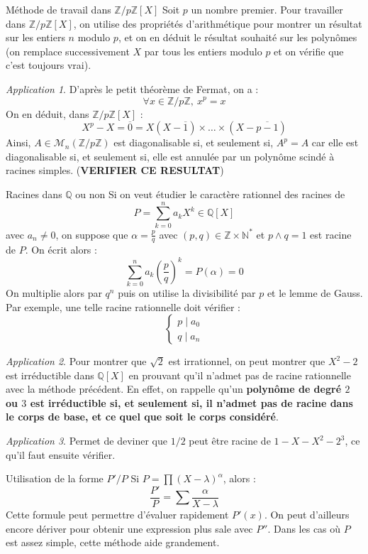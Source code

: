 \documentclass[french]{book}
\newcommand{\N}{\mathbb{N}}
\newcommand{\Z}{\mathbb{Z}}
\newcommand{\Q}{\mathbb{Q}}
\newcommand{\st}{^*}
\theoremstyle{plain}
\theoremstyle{definition}
\theoremstyle{remark}
\newtheorem*{app}{Application}
\begin{document}
\begin{AS}{Méthode de travail dans $\Z/p\Z[X]$} Soit $p$ un nombre premier. Pour travailler dans $\Z/p\Z[X]$, on utilise des propriétés d’arithmétique pour montrer un résultat sur les entiers $n$ modulo $p$, et on en déduit le résultat souhaité sur les polynômes (on remplace successivement $X$ par tous les entiers modulo $p$ et on vérifie que c’est toujours vrai).
\end{AS}
\begin{app}
	D'après le petit théorème de Fermat, on a : $$\forall x\in\Z/p\Z,\ x^p=x$$ On en déduit, dans $\Z/p\Z[X]$ : $$X^p-X=\overline{0}=X(X-\overline{1})\times\ldots\times(X-\overline{p-1})$$ Ainsi, $A\in\mathcal{M}_n(\Z/p\Z)$ est diagonalisable si, et seulement si, $A^p=A$ car elle est diagonalisable si, et seulement si, elle est annulée par un polynôme scindé à racines simples. (\textbf{VERIFIER CE RESULTAT})
\end{app}
\begin{AS}{Racines dans $\Q$ ou non} Si on veut étudier le caractère rationnel des racines de $$P=\sum_{k=0}^{n}a_kX^k\in\Q[X]$$ avec $a_n\ne0$, on suppose que $\alpha=\displaystyle\frac{p}{q}$ avec $(p,q)\in\Z\times\N\st$ et $p\wedge q=1$ est racine de $P$. On écrit alors : $$\sum_{k=0}^{n}a_k\left(\frac{p}{q}\right)^k=P(\alpha)=0$$ On multiplie alors par $q^n$ puis on utilise la divisibilité par $p$ et le lemme de Gauss. Par exemple, une telle racine rationnelle doit vérifier : $$\begin{cases}
	p\mid a_0\\
	q\mid a_n
\end{cases}$$
\end{AS}
\begin{app}
	Pour montrer que $\sqrt{2}$ est irrationnel, on peut montrer que $X^2-2$ est irréductible dans $\Q[X]$ en prouvant qu'il n'admet pas de racine rationnelle avec la méthode précédent. En effet, on rappelle qu'un \textbf{polynôme de degré $2$ ou $3$ est irréductible si, et seulement si, il n'admet pas de racine dans le corps de base, et ce quel que soit le corps considéré}.
\end{app}
\begin{app}
	Permet de deviner que $1/2$ peut être racine de $1-X-X^2-2^3$, ce qu'il faut ensuite vérifier.
\end{app}
\begin{AS}{Utilisation de la forme $P'/P$} Si $P=\prod(X-\lambda)^\alpha$, alors : $$\frac{P'}{P}=\sum\frac{\alpha}{X-\lambda}$$ Cette formule peut permettre d'évaluer rapidement $P'(x)$. On peut d'ailleurs encore dériver pour obtenir une expression plus sale avec $P''$. Dans les cas où $P$ est assez simple, cette méthode aide grandement.
\end{AS}
\end{document}
